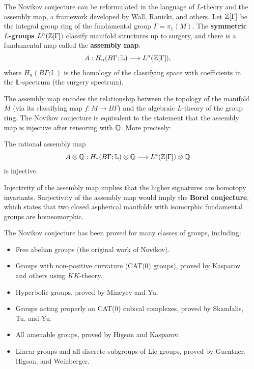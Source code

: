 The Novikov conjecture can be reformulated in the language of \(L\)-theory and the assembly map, a framework developed by Wall, Ranicki, and others. Let \(\mathbb{Z}[\Gamma]\) be the integral group ring of the fundamental group \(\Gamma = \pi_1(M)\). The \textbf{symmetric \(L\)-groups} \(L^n(\mathbb{Z}[\Gamma])\) classify manifold structures up to surgery, and there is a fundamental map called the \textbf{assembly map}:
\[
A: H_n(B\Gamma; \mathbb{L}) \longrightarrow L^n(\mathbb{Z}[\Gamma]),
\]
where \(H_n(B\Gamma; \mathbb{L})\) is the homology of the classifying space with coefficients in the \(\mathbb{L}\)-spectrum (the surgery spectrum).

The assembly map encodes the relationship between the topology of the manifold \(M\) (via its classifying map \(f: M \to B\Gamma\)) and the algebraic \(L\)-theory of the group ring. The Novikov conjecture is equivalent to the statement that the assembly map is injective after tensoring with \(\mathbb{Q}\). More precisely:

\begin{conjecture}
The rational assembly map
\[
A \otimes \mathbb{Q}: H_*(B\Gamma; \mathbb{L}) \otimes \mathbb{Q} \longrightarrow L^*(\mathbb{Z}[\Gamma]) \otimes \mathbb{Q}
\]
is injective.
\end{conjecture}

Injectivity of the assembly map implies that the higher signatures are homotopy invariants. Surjectivity of the assembly map would imply the \textbf{Borel conjecture}, which states that two closed aspherical manifolds with isomorphic fundamental groups are homeomorphic.

The Novikov conjecture has been proved for many classes of groups, including:
\begin{itemize}
    \item Free abelian groups (the original work of Novikov).
    \item Groups with non-positive curvature (CAT(0) groups), proved by Kasparov and others using \(KK\)-theory.
    \item Hyperbolic groups, proved by Mineyev and Yu.
    \item Groups acting properly on CAT(0) cubical complexes, proved by Skandalis, Tu, and Yu.
    \item All amenable groups, proved by Higson and Kasparov.
    \item Linear groups and all discrete subgroups of Lie groups, proved by Guentner, Higson, and Weinberger.
\end{itemize}

